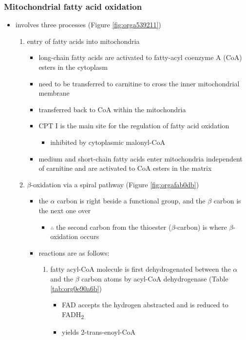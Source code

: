 \documentclass[12pt]{scrartcl}
\begin{document}
\subsubsection{Mitochondrial fatty acid oxidation}
\label{sec:org594ca94}
\begin{itemize}
\item involves three processes (Figure \ref{fig:orga539211})
\begin{enumerate}
\item entry of fatty acids into mitochondria
\begin{itemize}
\item long-chain fatty acids are activated to fatty-acyl coenzyme A (CoA) esters
in the cytoplasm
\item need to be transferred to carnitine to cross the inner
mitochondrial membrane
\item transferred back to CoA within the mitochondria
\item CPT I is the main site for the regulation of fatty acid
oxidation
\begin{itemize}
\item inhibited by cytoplasmic malonyl-CoA
\end{itemize}
\item medium and short-chain fatty acids enter mitochondria
independent of carnitine and are activated to CoA esters in the
matrix
\end{itemize}
\item \(\beta\)-oxidation via a spiral pathway (Figure \ref{fig:orgafab0db})
\begin{itemize}
\item the \(\alpha\) carbon is right beside a functional group, and the
\(\beta\) carbon is the next one over
\begin{itemize}
\item \(\therefore\) the second carbon from the thioester (\(\beta\)-carbon) is where
\(\beta\)-oxidation occurs
\end{itemize}
\item reactions are as follows:
\begin{enumerate}
\item fatty acyl-CoA molecule is first dehydrogenated between the \(\alpha\)
and the \(\beta\) carbon atoms by acyl-CoA dehydrogenase (Table \ref{tab:org0e90a6b})
\begin{itemize}
\item FAD accepts the hydrogen abstracted and is reduced to FADH\textsubscript{2}
\item yields 2-trans-enoyl-CoA

\end{itemize}
\end{enumerate}
\end{itemize}
\end{enumerate}
\end{itemize}
\end{document}
